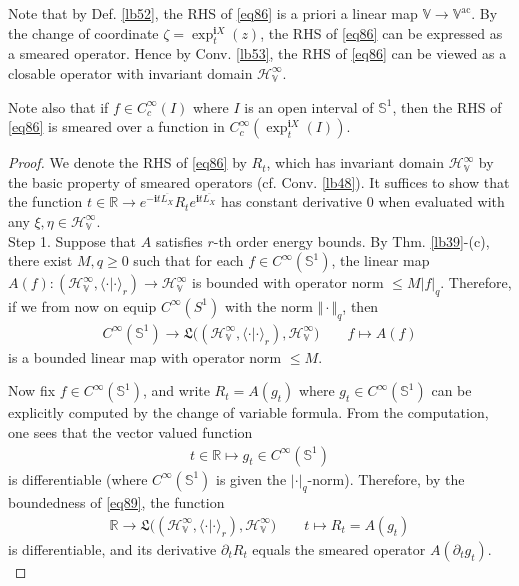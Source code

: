 \documentclass[12pt,b5paper,notitlepage]{article}
\theoremstyle{definition}
\theoremstyle{plain}
\newcommand{\fk}{\mathfrak}
\newcommand{\ovl}{\overline}
\newcommand{\bk}[1]{\langle {#1}\rangle}
\newcommand{\im}{\mathbf{i}}
\newcommand{\Vbb}{\mathbb V}
\newcommand{\Rbb}{\mathbb R}
\newcommand{\Sbb}{{\mathbb S}}
\newcommand{\HV}{\mathcal H_{\mathbb V}}
\newcommand{\ac}{\mathrm{ac}}
\numberwithin{equation}{section}
\begin{document}
Note that by Def. \ref{lb52}, the RHS of \eqref{eq86} is a priori a linear map $\Vbb\rightarrow\Vbb^\ac$. By the change of coordinate $\zeta=\exp^{\im X}_t(z)$, the RHS of \eqref{eq86} can be expressed as a smeared operator. Hence by Conv. \ref{lb53}, the  RHS of \eqref{eq86} can be viewed as a closable operator with invariant domain $\HV^\infty$.

Note also that if $f\in C_c^\infty(I)$ where $I$ is an open interval of $\Sbb^1$, then the RHS of \eqref{eq86} is smeared over a function in $C_c^\infty(\exp_t^{\im X}(I))$. 

\begin{proof}
We denote the RHS of \eqref{eq86} by $R_t$, which has invariant domain $\HV^\infty$ by the basic property of smeared operators (cf. Conv. \ref{lb48}). It suffices to show that the function $t\in\Rbb\rightarrow e^{-\im t\ovl{L_X}} R_te^{\im t\ovl{L_X}}$ has constant derivative $0$ when evaluated with any $\xi,\eta\in\HV^\infty$.\\[-1ex]




Step 1. Suppose that $A$ satisfies $r$-th order energy bounds. By Thm. \ref{lb39}-(c), there exist $M,q\geq0$ such that for each $f\in C^\infty(\Sbb^1)$, the linear map $A(f):(\HV^\infty,\bk{\cdot|\cdot}_r)\rightarrow\HV^\infty$ is bounded with operator norm $\leq M|f|_q$. Therefore, if we from now on equip $C^\infty(S^1)$ with the norm $\Vert\cdot\Vert_q$, then
\begin{gather}\label{eq89}
C^\infty(\Sbb^1)\rightarrow\fk L\big((\HV^\infty,\bk{\cdot|\cdot}_r),\HV^\infty\big)\qquad f\mapsto A(f)
\end{gather}
is a bounded linear map with operator norm $\leq M$.

Now fix $f\in C^\infty(\Sbb^1)$, and write $R_t=A(g_t)$ where $g_t\in C^\infty(\Sbb^1)$ can be explicitly computed by the change of variable formula. From the computation, one sees that the vector valued function
\begin{align*}
t\in\Rbb\mapsto g_t\in C^\infty(\Sbb^1)
\end{align*}
is differentiable (where $C^\infty(\Sbb^1)$ is given the $|\cdot|_q$-norm). Therefore, by the boundedness of \eqref{eq89}, the function
\begin{align*}
\Rbb\rightarrow\fk L\big((\HV^\infty,\bk{\cdot|\cdot}_r),\HV^\infty\big) \tag{a}\qquad t\mapsto R_t=A(g_t)\label{eq88}
\end{align*}
is differentiable, and its derivative $\partial_tR_t$ equals the smeared operator $A(\partial_tg_t)$.\\[-1ex]



\end{proof}
\end{document}

